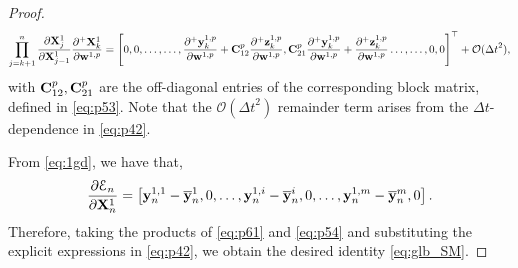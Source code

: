 \documentclass{article}
\newcommand{\by}{{\bf y}}
\newcommand{\bz}{{\bf z}}
\newcommand{\bw}{{\bf w}}
\newcommand{\bX}{{\bf X}}
\newcommand{\bC}{{\bf C}}
\newcommand{\ord}{{\mathcal O}}
\newcommand{\Dt}{{\Delta t}}
\newcommand{\E}{\EuScript{E}}
\begin{document}
\begin{proof}
\begin{equation}
    \label{eq:p54}
   \prod\limits_{j=k+1}^n  \frac{\partial \bX^1_j}{\partial \bX^1_{j-1}} \frac{\partial^+\bX^1_k}{\partial \bw^{1,p}} = \left[
0,0,\ldots,
\ldots,\frac{\partial^+\by^{1,p}_k}{\partial \bw^{1,p}}+\bC^p_{12}\frac{\partial^+\bz^{1,p}_k}{\partial \bw^{1,p}},\bC^p_{21}\frac{\partial^+\by^{1,p}_k}{\partial \bw^{1,p}}+\frac{\partial^+\bz^{1,p}_k}{\partial \bw^{1,p}}\ldots,\ldots,0,0\right]^\top + \ord(\Dt^2),
\end{equation}
with $\bC^p_{12},\bC^p_{21}$ are the off-diagonal entries of the corresponding block matrix, defined in \eqref{eq:p53}. Note that the $\ord(\Dt^2)$ remainder term arises from the $\Dt$-dependence in \eqref{eq:p42}.  

From \eqref{eq:1gd}, we have that,
\begin{equation}
    \label{eq:p61}
  \frac{\partial \E_n}{\partial \bX^1_n} = \left[\by^{1,1}_n-\overline{\by}^1_n,0,\ldots,\by^{1,i}_n-\overline{\by}^i_n,0,\ldots,\by^{1,m}_n-\overline{\by}^m_n,0\right].
  \end{equation}
 Therefore, taking the products of \eqref{eq:p61} and \eqref{eq:p54} and substituting the explicit expressions in \eqref{eq:p42}, we obtain the desired identity \eqref{eq:glb_SM}. 
 \end{proof}
\end{document}
